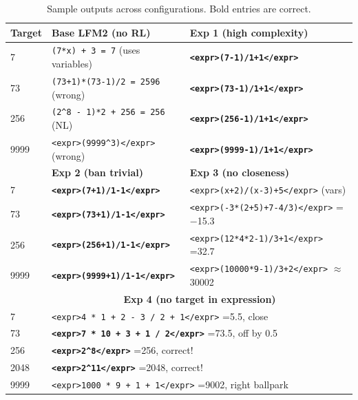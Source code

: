 \documentclass[11pt, letterpaper]{article}
\begin{document}
\begin{table}[H]
\centering
\caption{Sample outputs across configurations. Bold entries are correct.}
\label{tab:examples}
\begin{tabular}{p{2.4cm}p{4.5cm}p{4.5cm}}
\toprule
\textbf{Target} & \textbf{Base LFM2 (no RL)} & \textbf{Exp 1 (high complexity)} \\
\midrule
7    & \texttt{(7*x) + 3 = 7} \tiny{(uses variables)}  & \textbf{\texttt{<expr>(7-1)/1+1</expr>}} \\
73   & \texttt{(73+1)*(73-1)/2 = 2596} \tiny{(wrong)} & \textbf{\texttt{<expr>(73-1)/1+1</expr>}} \\
256  & \texttt{(2\^{}8 - 1)*2 + 256 = 256} \tiny{(NL)} & \textbf{\texttt{<expr>(256-1)/1+1</expr>}} \\
9999 & \texttt{<expr>(9999\^{}3)</expr>} \tiny{(wrong)}  & \textbf{\texttt{<expr>(9999-1)/1+1</expr>}} \\
\midrule
 & \textbf{Exp 2 (ban trivial)} & \textbf{Exp 3 (no closeness)} \\
\midrule
7    & \textbf{\texttt{<expr>(7+1)/1-1</expr>}}  & \texttt{<expr>(x+2)/(x-3)+5</expr>} \tiny{(vars)} \\
73   & \textbf{\texttt{<expr>(73+1)/1-1</expr>}} & \texttt{<expr>(-3*(2+5)+7-4/3)</expr>} \tiny{=$-$15.3} \\
256  & \textbf{\texttt{<expr>(256+1)/1-1</expr>}} & \texttt{<expr>(12*4*2-1)/3+1</expr>} \tiny{=32.7} \\
9999 & \textbf{\texttt{<expr>(9999+1)/1-1</expr>}} & \texttt{<expr>(10000*9-1)/3+2</expr>} \tiny{$\approx$30002} \\
\midrule
 & \multicolumn{2}{c}{\textbf{Exp 4 (no target in expression)}} \\
\midrule
7    & \multicolumn{2}{l}{\texttt{<expr>4 * 1 + 2 - 3 / 2 + 1</expr>} \tiny{=5.5, close}} \\
73   & \multicolumn{2}{l}{\textbf{\texttt{<expr>7 * 10 + 3 + 1 / 2</expr>}} \tiny{=73.5, off by 0.5}} \\
256  & \multicolumn{2}{l}{\textbf{\texttt{<expr>2\^{}8</expr>}} \tiny{=256, correct!}} \\
2048 & \multicolumn{2}{l}{\textbf{\texttt{<expr>2\^{}11</expr>}} \tiny{=2048, correct!}} \\
9999 & \multicolumn{2}{l}{\texttt{<expr>1000 * 9 + 1 + 1</expr>} \tiny{=9002, right ballpark}} \\
\bottomrule
\end{tabular}
\end{table}
\end{document}
